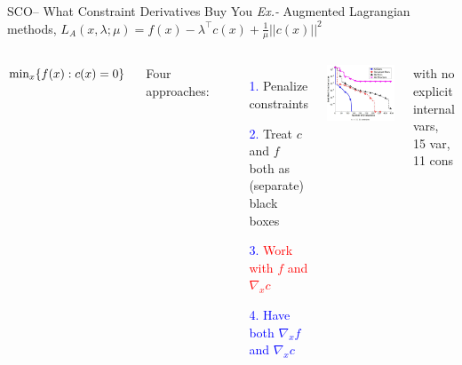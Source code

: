 \documentclass[handout,aspectratio=54]{beamer}
\numberwithin{theorem}{section}
\begin{document}
\begin{frame}{SCO– What Constraint Derivatives Buy You}
\small
\emph{Ex.-} Augmented Lagrangian methods, $L_A(x,\lambda;\mu)=f(x)-\lambda^\top c(x)+\frac{1}{\mu}||c(x)||^2$

\normalsize
\begin{columns}
\colorbox[rgb]{0.5,0.6,0.7}{\textcolor{white}{$\textup{min}_x\{f(x):c(x)=0\}$}}

\vspace{0.1cm}
Four approaches:
\begin{itemize}
\item[\textcolor{blue}{1.}] \textcolor[RGB]{255,25,240}{Penalize constraints}
\item[\textcolor{blue}{2.}] Treat $c$ and $f$ both as (separate) black boxes
\item[\textcolor{blue}{3.}] \textcolor{red}{Work with $f$ and $\nabla_x c$}
\item[\textcolor{blue}{4.}] \textcolor{blue}{Have both $\nabla_x f$ and $\nabla_x c$}
\end{itemize}

\includegraphics[width=\textwidth]{fig/60.jpg}

\small
with no explicit internal vars, 15 var, 11 cons
\end{columns}
\end{frame}
\end{document}
